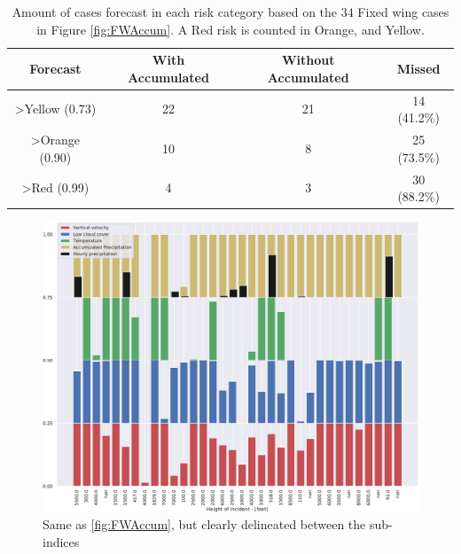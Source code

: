 \begin{table}
    \centering
    \begin{tabular}{c|c|c|c}
        Forecast & With Accumulated & Without Accumulated & Missed \\ \hline
        >Yellow (0.73) & 22 & 21 & 14 (41.2\%)\\
        >Orange (0.90) & 10& 8& 25 (73.5\%)\\ 
        >Red (0.99) & 4& 3& 30 (88.2\%)\\
    \end{tabular}
    \caption{Amount of cases forecast in each risk category based on the $34$ Fixed wing cases in Figure \ref{fig:FWAccum}. A Red risk is counted in Orange, and Yellow.}    \label{tab:FWCont}
\end{table}

\begin{figure}
    \centering
    \includegraphics[width=\textwidth]{Figures/FWDecomp.pdf}
    \caption{Same as \ref{fig:FWAccum}, but clearly delineated between the sub-indices}
    \label{fig:FWDecomp}
\end{figure}
